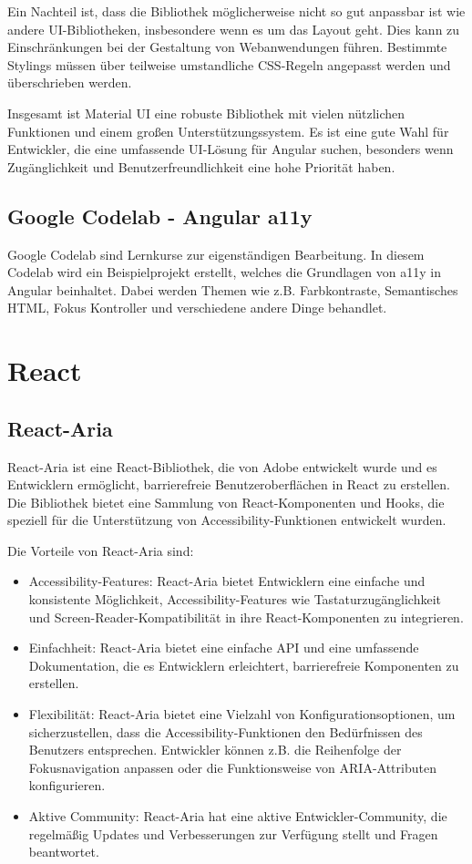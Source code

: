 Ein Nachteil ist, dass die Bibliothek möglicherweise nicht so gut anpassbar ist wie andere UI-Bibliotheken, insbesondere wenn es um das Layout geht. Dies kann zu Einschränkungen bei der Gestaltung von Webanwendungen führen. Bestimmte Stylings müssen über teilweise umstandliche CSS-Regeln angepasst werden und überschrieben werden.

Insgesamt ist Material UI eine robuste Bibliothek mit vielen nützlichen Funktionen und einem großen Unterstützungssystem. Es ist eine gute Wahl für Entwickler, die eine umfassende UI-Lösung für Angular suchen, besonders wenn Zugänglichkeit und Benutzerfreundlichkeit eine hohe Priorität haben.

\subsection{Google Codelab - Angular a11y}

Google Codelab sind Lernkurse zur eigenständigen Bearbeitung. In diesem Codelab wird ein Beispielprojekt erstellt, welches die Grundlagen von a11y in Angular beinhaltet. Dabei werden Themen wie z.B. Farbkontraste, Semantisches HTML, Fokus Kontroller und verschiedene andere Dinge behandlet.

\section{React}

\subsection{React-Aria}

React-Aria ist eine React-Bibliothek, die von Adobe entwickelt wurde und es Entwicklern ermöglicht, barrierefreie Benutzeroberflächen in React zu erstellen. Die Bibliothek bietet eine Sammlung von React-Komponenten und Hooks, die speziell für die Unterstützung von Accessibility-Funktionen entwickelt wurden.

Die Vorteile von React-Aria sind:

\begin{itemize}
    \item Accessibility-Features: React-Aria bietet Entwicklern eine einfache und konsistente Möglichkeit, Accessibility-Features wie Tastaturzugänglichkeit und Screen-Reader-Kompatibilität in ihre React-Komponenten zu integrieren.
    \item Einfachheit: React-Aria bietet eine einfache API und eine umfassende Dokumentation, die es Entwicklern erleichtert, barrierefreie Komponenten zu erstellen.
    \item Flexibilität: React-Aria bietet eine Vielzahl von Konfigurationsoptionen, um sicherzustellen, dass die Accessibility-Funktionen den Bedürfnissen des Benutzers entsprechen. Entwickler können z.B. die Reihenfolge der Fokusnavigation anpassen oder die Funktionsweise von ARIA-Attributen konfigurieren.
    \item Aktive Community: React-Aria hat eine aktive Entwickler-Community, die regelmäßig Updates und Verbesserungen zur Verfügung stellt und Fragen beantwortet.
\end{itemize}

